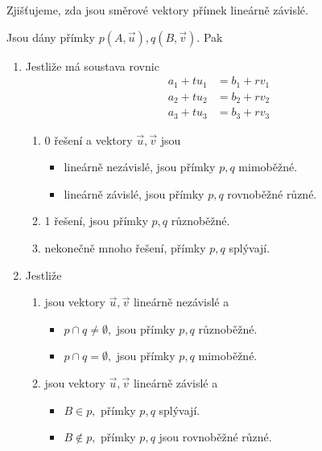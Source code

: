 \begin{reseni}
Zjišťujeme, zda jsou směrové vektory přímek lineárně závislé.
\end{reseni}

\begin{veta}
    Jsou dány přímky $p(A,\vec u), q(B,\vec v).$ Pak
    \begin{enumerate}[$i.$]
    \item Jestliže má soustava rovnic
    \begin{align*}
        a_1+tu_1 &= b_1 + rv_1 \\
        a_2+tu_2 &= b_2 + rv_2 \\
        a_3+tu_3 &= b_3 + rv_3
    \end{align*}
    \begin{enumerate}[$a.$]
    \item 0 řešení a vektory $\vec u, \vec v$ jsou
    \begin{itemize}
    \item lineárně nezávislé, jsou přímky $p,q$ mimoběžné.
   	\item lineárně závislé, jsou přímky $p,q$ rovnoběžné různé.
    \end{itemize}
   	\item 1 řešení, jsou přímky $p,q$ různoběžné.
   	\item nekonečně mnoho řešení, přímky $p,q$ splývají.
    \end{enumerate}
   	\item Jestliže
    \begin{enumerate}[$a.$]
    \item jsou vektory $\vec u, \vec v$ lineárně nezávislé a
    \begin{itemize}
    \item $p\cap q \ne \emptyset,$ jsou přímky $p,q$ různoběžné.
   	\item $p\cap q = \emptyset,$ jsou přímky $p,q$ mimoběžné.
    \end{itemize}
   	\item jsou vektory $\vec u, \vec v$ lineárně závislé a
   	\begin{itemize}
    \item $B\in p,$ přímky $p,q$ splývají.
   	\item $B\notin p,$ přímky $p,q$ jsou rovnoběžné různé.
    \end{itemize}
    \end{enumerate}
    \end{enumerate}
\end{veta}

